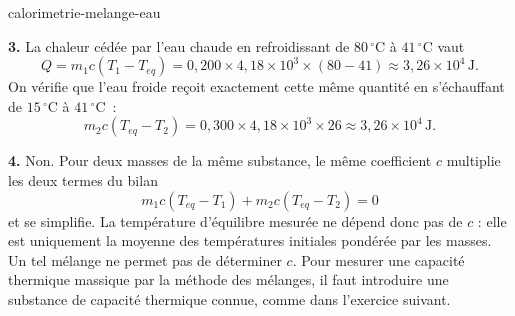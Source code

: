 \begin{exo}{calorimetrie-melange-eau}
\begin{solution}
\textbf{3.} La chaleur cédée par l'eau chaude en refroidissant de $80\,^\circ\text{C}$ à $41\,^\circ\text{C}$ vaut
\[
Q = m_1 c (T_1 - T_{eq})
=0{,}200\times4{,}18\times10^3\times(80-41)
\approx3{,}26\times10^4\,\text{J}.
\]
On vérifie que l'eau froide reçoit exactement cette même quantité en s'échauffant de $15\,^\circ\text{C}$ à $41\,^\circ\text{C}$~:
\[
m_2c(T_{eq}-T_2)
=0{,}300\times4{,}18\times10^3\times26
\approx3{,}26\times10^4\,\text{J}.
\]

\textbf{4.} Non. Pour deux masses de la même substance, le même coefficient $c$ multiplie les deux termes du bilan
\[
m_1c(T_{eq}-T_1)+m_2c(T_{eq}-T_2)=0
\]
et se simplifie. La température d'équilibre mesurée ne dépend donc pas de $c$ : elle est uniquement la moyenne des températures initiales pondérée par les masses. Un tel mélange ne permet pas de déterminer $c$. Pour mesurer une capacité thermique massique par la méthode des mélanges, il faut introduire une substance de capacité thermique connue, comme dans l'exercice suivant.
\end{solution}

\end{exo}

